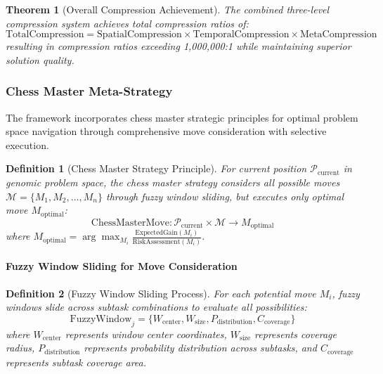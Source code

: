 \documentclass[12pt,a4paper]{article}
\newtheorem{theorem}{Theorem}
\newtheorem{definition}{Definition}
\begin{document}
\begin{theorem}[Overall Compression Achievement]
The combined three-level compression system achieves total compression ratios of:
\begin{equation}
\text{TotalCompression} = \text{SpatialCompression} \times \text{TemporalCompression} \times \text{MetaCompression}
\end{equation}
resulting in compression ratios exceeding 1,000,000:1 while maintaining superior solution quality.
\end{theorem}

\subsubsection{Chess Master Meta-Strategy}

The framework incorporates chess master strategic principles for optimal problem space navigation through comprehensive move consideration with selective execution.

\begin{definition}[Chess Master Strategy Principle]
For current position $\mathcal{P}_{\text{current}}$ in genomic problem space, the chess master strategy considers all possible moves $\mathcal{M} = \{M_1, M_2, ..., M_n\}$ through fuzzy window sliding, but executes only optimal move $M_{\text{optimal}}$:
\begin{equation}
\text{ChessMasterMove}: \mathcal{P}_{\text{current}} \times \mathcal{M} \rightarrow M_{\text{optimal}}
\end{equation}
where $M_{\text{optimal}} = \arg\max_{M_i} \frac{\text{ExpectedGain}(M_i)}{\text{RiskAssessment}(M_i)}$.
\end{definition}

\paragraph{Fuzzy Window Sliding for Move Consideration}

\begin{definition}[Fuzzy Window Sliding Process]
For each potential move $M_i$, fuzzy windows slide across subtask combinations to evaluate all possibilities:
\begin{equation}
\text{FuzzyWindow}_j = \{W_{\text{center}}, W_{\text{size}}, P_{\text{distribution}}, C_{\text{coverage}}\}
\end{equation}
where $W_{\text{center}}$ represents window center coordinates, $W_{\text{size}}$ represents coverage radius, $P_{\text{distribution}}$ represents probability distribution across subtasks, and $C_{\text{coverage}}$ represents subtask coverage area.
\end{definition}
\end{document}
